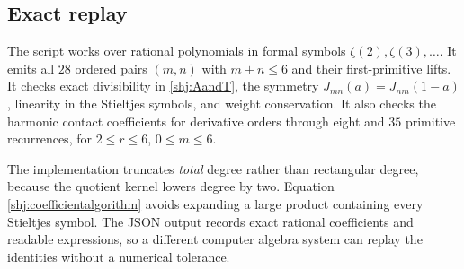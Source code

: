 \subsection{Exact replay}
The script  works over rational polynomials in formal symbols $\zeta(2),\zeta(3),\ldots$. It emits all $28$ ordered pairs $(m,n)$ with $m+n\le6$ and their first-primitive lifts. It checks exact divisibility in \eqref{shj:AandT}, the symmetry $J_{mn}(a)=J_{nm}(1-a)$, linearity in the Stieltjes symbols, and weight conservation. It also checks the harmonic contact coefficients for derivative orders through eight and $35$ primitive recurrences, for $2\le r\le6$, $0\le m\le6$.

The implementation truncates \emph{total} degree rather than rectangular degree, because the quotient kernel lowers degree by two. Equation \eqref{shj:coefficientalgorithm} avoids expanding a large product containing every Stieltjes symbol. The JSON output records exact rational coefficients and readable expressions, so a different computer algebra system can replay the identities without a numerical tolerance.

